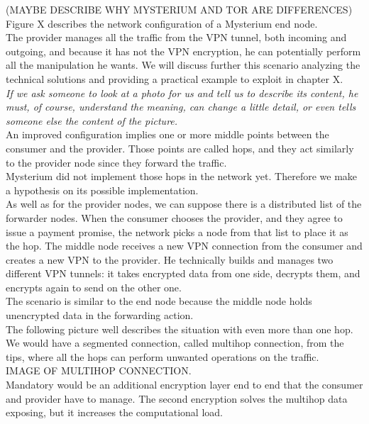 \documentclass[]{article}
\begin{document}
	(MAYBE DESCRIBE WHY MYSTERIUM AND TOR ARE DIFFERENCES)\\

	Figure X describes the network configuration of a Mysterium end node.\\
	The provider manages all the traffic from the VPN tunnel, both incoming and outgoing, and because it has not the VPN encryption, he can potentially perform all the manipulation he wants. We will discuss further this scenario analyzing the technical solutions and providing a practical example to exploit in chapter X.\\
	\textit{If we ask someone to look at a photo for us and tell us to describe its content, he must, of course, understand the meaning, can change a little detail, or even tells someone else the content of the picture.}\\
	An improved configuration implies one or more middle points between the consumer and the provider. Those points are called hops, and they act similarly to the provider node since they forward the traffic.\\
	Mysterium did not implement those hops in the network yet. Therefore we make a hypothesis on its possible implementation.\\
	As well as for the provider nodes, we can suppose there is a distributed list of the forwarder nodes. When the consumer chooses the provider, and they agree to issue a payment promise, the network picks a node from that list to place it as the hop. The middle node receives a new VPN connection from the consumer and creates a new VPN to the provider. He technically builds and manages two different VPN tunnels: it takes encrypted data from one side, decrypts them, and encrypts again to send on the other one.\\
	The scenario is similar to the end node because the middle node holds unencrypted data in the forwarding action.\\
	The following picture well describes the situation with even more than one hop. We would have a segmented connection, called multihop connection, from the tips, where all the hops can perform unwanted operations on the traffic.\\

	IMAGE OF MULTIHOP CONNECTION.\\

	Mandatory would be an additional encryption layer end to end that the consumer and provider have to manage. The second encryption solves the multihop data exposing, but it increases the computational load.\\
	
\end{document}
